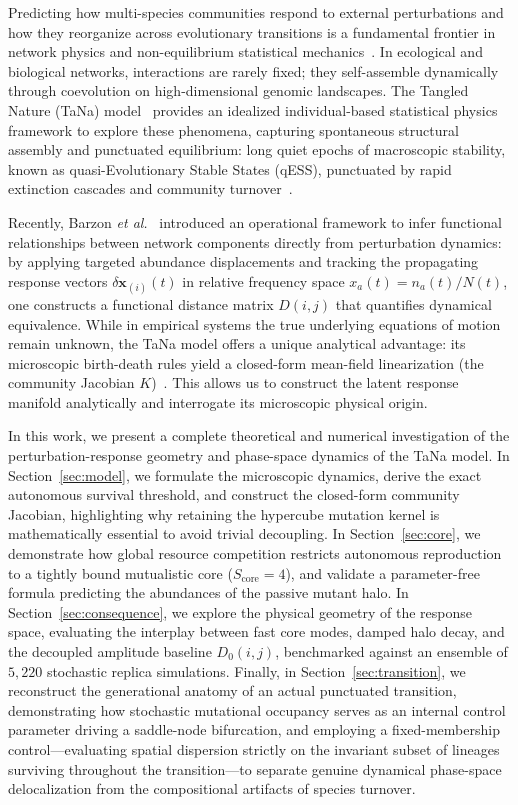 \documentclass[twocolumn,amsmath,amssymb,aps,pra,10pt,floatfix,nofootinbib]{revtex4-2}
\begin{document}
Predicting how multi-species communities respond to external perturbations and how they reorganize across evolutionary transitions is a fundamental frontier in network physics and non-equilibrium statistical mechanics~\cite{gao2016universal}. In ecological and biological networks, interactions are rarely fixed; they self-assemble dynamically through coevolution on high-dimensional genomic landscapes. The Tangled Nature (TaNa) model~\cite{christensen2002tangled} provides an idealized individual-based statistical physics framework to explore these phenomena, capturing spontaneous structural assembly and punctuated equilibrium: long quiet epochs of macroscopic stability, known as quasi-Evolutionary Stable States (qESS), punctuated by rapid extinction cascades and community turnover~\cite{becker2014evolution}.

Recently, Barzon \textit{et al.}~\cite{barzon2024unraveling} introduced an operational framework to infer functional relationships between network components directly from perturbation dynamics: by applying targeted abundance displacements and tracking the propagating response vectors $\delta\mathbf{x}_{(i)}(t)$ in relative frequency space $x_a(t) = n_a(t) / N(t)$, one constructs a functional distance matrix $D(i,j)$ that quantifies dynamical equivalence. While in empirical systems the true underlying equations of motion remain unknown, the TaNa model offers a unique analytical advantage: its microscopic birth-death rules yield a closed-form mean-field linearization (the community Jacobian $K$)~\cite{cairoli2014forecasting}. This allows us to construct the latent response manifold analytically and interrogate its microscopic physical origin.

In this work, we present a complete theoretical and numerical investigation of the perturbation-response geometry and phase-space dynamics of the TaNa model. In Section~\ref{sec:model}, we formulate the microscopic dynamics, derive the exact autonomous survival threshold, and construct the closed-form community Jacobian, highlighting why retaining the hypercube mutation kernel is mathematically essential to avoid trivial decoupling. In Section~\ref{sec:core}, we demonstrate how global resource competition restricts autonomous reproduction to a tightly bound mutualistic core ($S_{\text{core}} = 4$), and validate a parameter-free formula predicting the abundances of the passive mutant halo. In Section~\ref{sec:consequence}, we explore the physical geometry of the response space, evaluating the interplay between fast core modes, damped halo decay, and the decoupled amplitude baseline $D_0(i,j)$, benchmarked against an ensemble of $5{,}220$ stochastic replica simulations. Finally, in Section~\ref{sec:transition}, we reconstruct the generational anatomy of an actual punctuated transition, demonstrating how stochastic mutational occupancy serves as an internal control parameter driving a saddle-node bifurcation, and employing a fixed-membership control---evaluating spatial dispersion strictly on the invariant subset of lineages surviving throughout the transition---to separate genuine dynamical phase-space delocalization from the compositional artifacts of species turnover.
\end{document}
